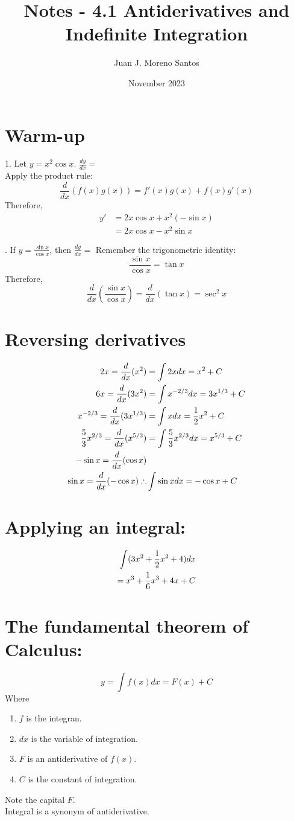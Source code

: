 \documentclass[11pt]{article}
\newcommand*{\vs}{\vspace{1cm}}
\newcommand*{\next}{\noindent}
\newcommand*{\set}{\setcounter{equation}{0}}
\begin{document}
\title{Notes - 4.1 Antiderivatives and Indefinite Integration}
\author{Juan J. Moreno Santos}
\date{November 2023}

\maketitle

\section{Warm-up}
1. Let $y=x^2\cos x$. $\frac{dy}{dx}=$\\
Apply the product rule:
\[\frac{d}{dx}(f(x)g(x))=f'(x)g(x)+f(x)g'(x)\]
Therefore,
\begin{align}
    y'&=2x\cos x+x^2(-\sin x)\\
    &=2x\cos x-x^2\sin x
\end{align}

\vs
\next
2. If $y=\frac{\sin x}{\cos x}$, then $\frac{dy}{dx}=$
Remember the trigonometric identity:
\[\frac{\sin x}{\cos x}=\tan x\]
Therefore,
\[\frac{d}{dx}\left(\frac{\sin x}{\cos x}\right)=\frac{d}{dx}(\tan x)=\sec^2 x\]

\section{Reversing derivatives}
\begin{align}
    \set
    2x=\frac{d}{dx}(x^2)&=\int 2xdx=x^2+C\\
    6x=\frac{d}{dx}(3x^2)&=\int x^{-2/3}dx=3x^{1/3}+C\\
    x^{-2/3}=\frac{d}{dx}(3x^{1/3})&=\int xdx=\frac{1}{2}x^2+C\\
    \frac{5}{3}x^{2/3}=\frac{d}{dx}(x^{5/3})&=\int \frac{5}{3}x^{2/3}dx=x^{5/3}+C\\
    -\sin x=\frac{d}{dx}(\cos x)\\
    \sin x=\frac{d}{dx}(-\cos x)\therefore &\int \sin xdx=-\cos x+C
\end{align}

\section{Applying an integral:}
\begin{align}
    \set
    \int (3x^2+\frac{1}{2}x^2+4)dx\\
    =x^3+\frac{1}{6}x^3+4x+C
\end{align}

\section{The fundamental theorem of Calculus:}
\[y=\int f(x)dx=F(x)+C\]
Where
\begin{enumerate}
    \item $f$ is the integran.
    \item $dx$ is the variable of integration.
    \item $F$ is an antiderivative of $f(x)$.
    \item $C$ is the constant of integration.
\end{enumerate}
Note the capital $F$.\\
Integral is a synonym of antiderivative.
\end{document}

